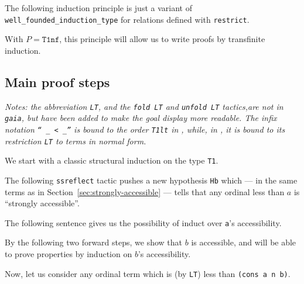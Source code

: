 The following induction principle is just a variant of \texttt{well\_founded\_induction\_type} for relations defined with \texttt{restrict}.


With $P=\texttt{T1nf}$, this principle will allow us to write proofs by transfinite induction.

\subsection{Main proof steps}

\emph{Notes: the abbreviation \texttt{LT}, and the \texttt{fold LT} and \texttt{unfold LT} tactics,are not in \texttt{gaia}, but  have been added to make the goal display more readable.
The infix notation \texttt{`` \_ < \_''}  is bound to the order \texttt{T1lt} in \gaia, while,  in \Hydras,  it is bound to its restriction \texttt{LT} to terms in normal form. }

We start with a classic structural induction on the type \texttt{T1}.

The following \texttt{ssreflect} tactic  pushes a new hypothesis \texttt{Hb} which --- in the same terms as in Section~\vref{sec:strongly-accessible} --- tells that any ordinal less than $a$ is ``strongly accessible''.


The following sentence gives us the possibility of induct over \texttt{a}'s accessibility.



By the following two forward steps, we show that $b$ is accessible, and will be able to prove properties by induction on $b$'s accessibility.




Now, let us consider any ordinal term which is (by \texttt{LT}) less than \texttt{(cons a n b)}.


